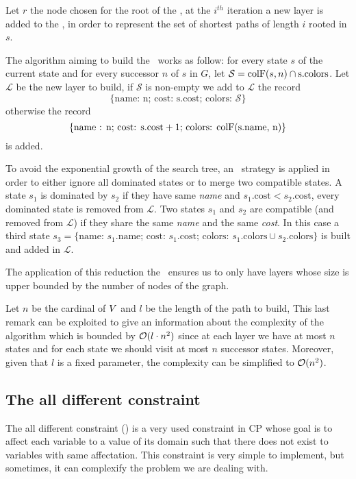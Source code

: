 Let $r$ the node chosen for the root of the \mdd, at the $i^{th}$ iteration a new layer is added to the \mdd, in order to represent the set of shortest paths of length $i$ rooted in $s$.

The algorithm aiming to build the \mdd\ works as follow: for every state $s$ of the current state and for every successor $n$ of $s$ in $G$, let $\mathcal{S} = \text{colF}(s, n) \cap \text{s.colors}$. Let $\mathcal{L}$ be the new layer to build, if $\mathcal{S}$ is non-empty we add to $\mathcal{L}$ the record
$$\{\text{name: n; cost: s.cost; colors: } \mathcal{S}\}$$ otherwise the record
$$\{\text{name : n; cost: s.cost} + 1 \text{; colors: \text{colF}(s.name, n)}\}$$ is added.

To avoid the exponential growth of the search tree, an \adhoc\ strategy is applied in order to either ignore all dominated states or to merge two compatible states. A state $s_1$ is dominated by $s_2$ if they have same \textit{name} and $s_1.\text{cost} < s_2.\text{cost}$, every dominated state is removed from $\mathcal{L}$. Two states $s_1$ and $s_2$ are compatible (and removed from $\mathcal{L}$) if they share the same \textit{name} and the same \textit{cost}. In this case a third state $s_3 = \{\text{name: } s_1.\text{name; cost: } s_1.\text{cost; colors: } s_1.\text{colors} \cup s_2.\text{colors}\}$ is built and added in $\mathcal{L}$.

The application of this reduction the \mdd\ ensures us to only have layers whose size is upper bounded by the number of nodes of the graph.

Let $n$ be the cardinal of $V$ and $l$ be the length of the path to build, This last remark can be exploited to give an information about the complexity of the algorithm which is bounded by $\mathcal{O}(l \cdot n^2)$ since at each layer we have at most $n$ states and for each state we should visit at most $n$ successor states. Moreover, given that $l$ is a fixed parameter, the complexity can be simplified to $\mathcal{O}(n^2)$.



\subsection{The all different constraint}

The all different constraint (\alldiff) is a very used constraint in CP whose goal is to affect each variable to a value of its domain such that there does not exist to variables with same affectation. This constraint is very simple to implement, but sometimes, it can complexify the problem we are dealing with.

